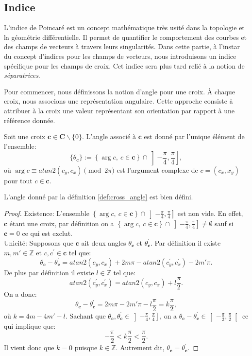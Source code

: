 \subsection{Indice}

L'indice de Poincaré est un concept mathématique très usité dans la topologie et la géométrie différentielle. Il permet de quantifier le comportement des courbes et des champs de vecteurs à travers leurs singularités. Dans cette partie, à l'instar du concept d'indices pour les champs de vecteurs, nous introduisons un indice spécifique pour les champs de croix. Cet indice sera plus tard relié à la notion de \emph{séparatrices}.

Pour commencer, nous définissons la notion d'angle pour une croix. À chaque croix, nous associons une représentation angulaire. Cette approche consiste à attribuer à la croix une valeur représentant son orientation par rapport à une référence donnée.

\begin{definition}
    \label{def:cross_angle}
    Soit une croix $\mathbf{c}\in\mathbf{C}\backslash\{0\}$. L'angle associé à $\mathbf{c}$ est donné par l'unique élément de l'ensemble:
    $$\{\theta_{\mathbf{c}}\} := \left\{\arg c,~c\in \mathbf{c}\right\} \cap \left]-\frac{\pi}{4},\frac{\pi}{4}\right],$$
    où $\arg c\equiv atan2(c_y, c_x)\pmod{2\pi}$ est l'argument complexe de $c=(c_x, x_y)$ pour tout $c\in\mathbf{c}$.
\end{definition}

\begin{lemma}
    L'angle donné par la définition \ref{def:cross_angle} est bien défini.
\end{lemma}

\begin{proof}
    Existence: L'ensemble $\left\{\arg c,~c\in \mathbf{c}\right\} \cap \left]-\frac{\pi}{4},\frac{\pi}{4}\right]$ est non vide. En effet, $\mathbf{c}$ étant une croix, par définition on a $\left\{\arg c,~c\in \mathbf{c}\right\} \cap \left]-\frac{\pi}{4},\frac{\pi}{4}\right]\neq\emptyset$ sauf si $\mathbf{c}=0$ ce qui est exclut.\\
    Unicité: Supposons que $\mathbf{c}$ ait deux angles $\theta_{\mathbf{c}}$ et $\theta^{'}_{\mathbf{c}}$. Par définition il existe $m, m'\in\mathbb{Z}$ et $c,c^{'}\in\mathbf{c}$ tel que:
    $$
    \theta_{\mathbf{c}}-\theta^{'}_{\mathbf{c}}=atan2(c_y, c_x)+2m\pi-atan2(c^{'}_y, c^{'}_x)-2m'\pi.
    $$
    De plus par définition il existe $l\in\mathbb{Z}$ tel que:
    $$
    atan2(c^{'}_y,c^{'}_x)=atan2(c_y,c_x)+l\frac{\pi}{2}.
    $$
    On a donc:
    $$
    \theta_{\mathbf{c}}-\theta^{'}_{\mathbf{c}}=2m\pi-2m'\pi-l\frac{\pi}{2}=k\frac{\pi}{2},
    $$
    où $k=4m-4m'-l$.
    Sachant que $\theta_{\mathbf{c}},\theta_{\mathbf{c}}^{'}\in\left]-\frac{\pi}{4},\frac{\pi}{4}\right]$, on a $\theta_{\mathbf{c}}-\theta^{'}_{\mathbf{c}}\in\left]-\frac{\pi}{2},\frac{\pi}{2}\right[$ ce qui implique que:
    $$
    -\frac{\pi}{2}<k\frac{\pi}{2}<\frac{\pi}{2}.
    $$
    Il vient donc que $k=0$ puisque $k\in\mathbb{Z}$. Autrement dit, $\theta_{\mathbf{c}}=\theta_{\mathbf{c}}^{'}$.
\end{proof}

